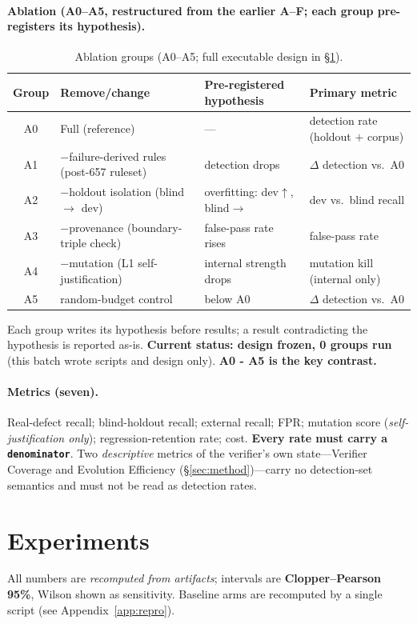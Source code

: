\documentclass{article}
\begin{document}
\paragraph{Ablation (A0--A5, restructured from the earlier A--F; each group pre-registers its hypothesis).}
\begin{table}[t]
\caption{Ablation groups (A0--A5; full executable design in \S\ref{sec:exp}).}
\label{tab:ablation}
\centering
\small
\begin{tabular}{@{}clp{5.6cm}p{3.4cm}@{}}
\toprule
Group & Remove/change & Pre-registered hypothesis & Primary metric \\
\midrule
A0 & Full (reference) & --- & detection rate (holdout $+$ corpus) \\
A1 & $-$failure-derived rules (post-657 ruleset) & detection drops & $\Delta$ detection vs.\ A0 \\
A2 & $-$holdout isolation (blind $\to$ dev) & overfitting: dev$\uparrow$, blind$\to$ & dev vs.\ blind recall \\
A3 & $-$provenance (boundary-triple check) & false-pass rate rises & false-pass rate \\
A4 & $-$mutation (L1 self-justification) & internal strength drops & mutation kill (internal only) \\
A5 & random-budget control & below A0 & $\Delta$ detection vs.\ A0 \\
\bottomrule
\end{tabular}
\end{table}
Each group writes its hypothesis before results; a result contradicting the hypothesis is reported
as-is. \textbf{Current status: design frozen, 0 groups run} (this batch wrote scripts and design
only). \textbf{A0 - A5 is the key contrast.}

\paragraph{Metrics (seven).} Real-defect recall; blind-holdout recall; external recall; FPR;
mutation score (\emph{self-justification only}); regression-retention rate; cost. \textbf{Every
rate must carry a \texttt{denominator}}. Two \emph{descriptive} metrics of the verifier's own
state---Verifier Coverage and Evolution Efficiency (\S\ref{sec:method})---carry no detection-set
semantics and must not be read as detection rates.

\section{Experiments}
\label{sec:exp}
All numbers are \emph{recomputed from artifacts}; intervals are \textbf{Clopper--Pearson 95\%},
Wilson shown as sensitivity. Baseline arms are recomputed by a single script (see Appendix~\ref{app:repro}).
\end{document}
